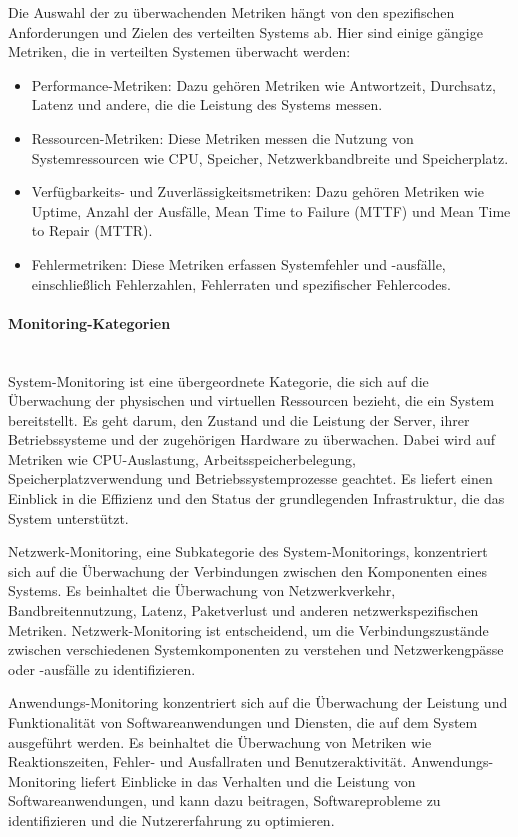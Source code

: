 \documentclass[../vs-script-first-v01.tex]{subfiles}
\begin{document}
Die Auswahl der zu überwachenden Metriken hängt von den spezifischen Anforderungen und Zielen des verteilten Systems ab. Hier sind einige gängige Metriken, die in verteilten Systemen überwacht werden:
\begin{itemize}
\item Performance-Metriken: Dazu gehören Metriken wie Antwortzeit, Durchsatz, Latenz und andere, die die Leistung des Systems messen.
\item Ressourcen-Metriken: Diese Metriken messen die Nutzung von Systemressourcen wie CPU, Speicher, Netzwerkbandbreite und Speicherplatz.
\item Verfügbarkeits- und Zuverlässigkeitsmetriken: Dazu gehören Metriken wie Uptime, Anzahl der Ausfälle, Mean Time to Failure (MTTF) und Mean Time to Repair (MTTR).
\item Fehlermetriken: Diese Metriken erfassen Systemfehler und -ausfälle, einschließlich Fehlerzahlen, Fehlerraten und spezifischer Fehlercodes.
\end{itemize}
\paragraph{Monitoring-Kategorien \\\\}
System-Monitoring ist eine übergeordnete Kategorie, die sich auf die Überwachung der physischen und virtuellen Ressourcen bezieht, die ein System bereitstellt. Es geht darum, den Zustand und die Leistung der Server, ihrer Betriebssysteme und der zugehörigen Hardware zu überwachen. Dabei wird auf Metriken wie CPU-Auslastung, Arbeitsspeicherbelegung, Speicherplatzverwendung und Betriebssystemprozesse geachtet. Es liefert einen Einblick in die Effizienz und den Status der grundlegenden Infrastruktur, die das System unterstützt.

Netzwerk-Monitoring, eine Subkategorie des System-Monitorings, konzentriert sich auf die Überwachung der Verbindungen zwischen den Komponenten eines Systems. Es beinhaltet die Überwachung von Netzwerkverkehr, Bandbreitennutzung, Latenz, Paketverlust und anderen netzwerkspezifischen Metriken. Netzwerk-Monitoring ist entscheidend, um die Verbindungszustände zwischen verschiedenen Systemkomponenten zu verstehen und Netzwerkengpässe oder -ausfälle zu identifizieren.

Anwendungs-Monitoring konzentriert sich auf die Überwachung der Leistung und Funktionalität von Softwareanwendungen und Diensten, die auf dem System ausgeführt werden. Es beinhaltet die Überwachung von Metriken wie Reaktionszeiten, Fehler- und Ausfallraten und Benutzeraktivität. Anwendungs-Monitoring liefert Einblicke in das Verhalten und die Leistung von Softwareanwendungen, und kann dazu beitragen, Softwareprobleme zu identifizieren und die Nutzererfahrung zu optimieren.
\end{document}
